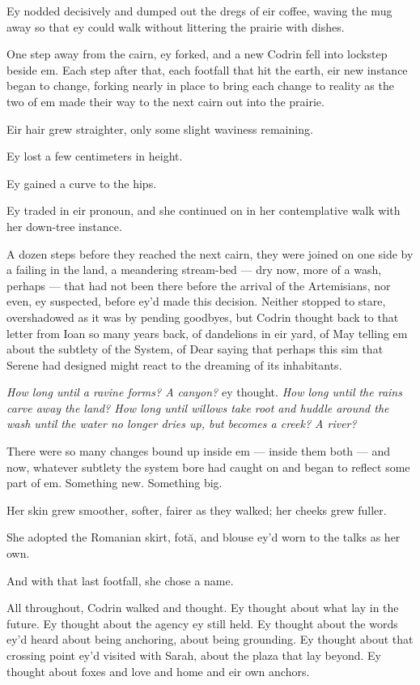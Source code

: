 Ey nodded decisively and dumped out the dregs of eir coffee, waving the mug away so that ey could walk without littering the prairie with dishes.

One step away from the cairn, ey forked, and a new Codrin fell into lockstep beside em. Each step after that, each footfall that hit the earth, eir new instance began to change, forking nearly in place to bring each change to reality as the two of em made their way to the next cairn out into the prairie.

Eir hair grew straighter, only some slight waviness remaining.

Ey lost a few centimeters in height.

Ey gained a curve to the hips.

Ey traded in eir pronoun, and she continued on in her contemplative walk with her down-tree instance.

A dozen steps before they reached the next cairn, they were joined on one side by a failing in the land, a meandering stream-bed — dry now, more of a wash, perhaps — that had not been there before the arrival of the Artemisians, nor even, ey suspected, before ey'd made this decision. Neither stopped to stare, overshadowed as it was by pending goodbyes, but Codrin thought back to that letter from Ioan so many years back, of dandelions in eir yard, of May telling em about the subtlety of the System, of Dear saying that perhaps this sim that Serene had designed might react to the dreaming of its inhabitants.

\emph{How long until a ravine forms? A canyon?} ey thought. \emph{How long until the rains carve away the land? How long until willows take root and huddle around the wash until the water no longer dries up, but becomes a creek? A river?}

There were so many changes bound up inside em — inside them both — and now, whatever subtlety the system bore had caught on and began to reflect some part of em. Something new. Something big.

Her skin grew smoother, softer, fairer as they walked; her cheeks grew fuller.

She adopted the Romanian skirt, fotă, and blouse ey'd worn to the talks as her own.

And with that last footfall, she chose a name.

All throughout, Codrin walked and thought. Ey thought about what lay in the future. Ey thought about the agency ey still held. Ey thought about the words ey'd heard about being anchoring, about being grounding. Ey thought about that crossing point ey'd visited with Sarah, about the plaza that lay beyond. Ey thought about foxes and love and home and eir own anchors.


